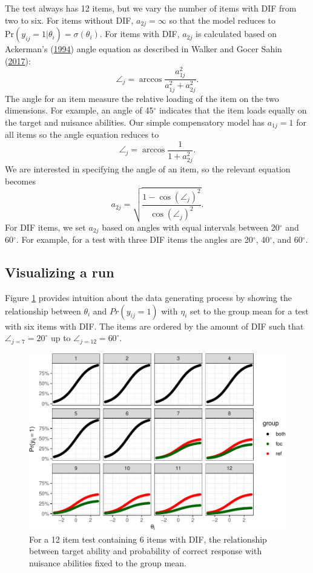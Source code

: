 \documentclass[
  11pt,
]{article}
\begin{document}
The test always has 12 items, but we vary the number of items with DIF from two to six. For items without DIF, \(a_{2j} = \infty\) so that the model reduces to \(\text{Pr}(y_{ij} = 1 | \theta_i) = \sigma(\theta_i)\). For items with DIF, \(a_{2j}\) is calculated based on Ackerman's (\protect\hyperlink{ref-ackerman1994using}{1994}) angle equation as described in Walker and Gocer Sahin (\protect\hyperlink{ref-walker2017using}{2017}):
\[
\angle_j = \arccos \dfrac{a_{1j}^2}{a_{1j}^2 + a_{2j}^2}.
\]
The angle for an item measure the relative loading of the item on the two dimensions. For example, an angle of 45\(^\circ\) indicates that the item loads equally on the target and nuisance abilities. Our simple compensatory model has \(a_{1j} = 1\) for all items so the angle equation reduces to
\[
\angle_j = \arccos \dfrac{1}{1 + a_{2j}^2}.
\]
We are interested in specifying the angle of an item, so the relevant equation becomes
\[
a_{2j} = \sqrt{\dfrac{1 - \cos(\angle_j)^2}{\cos(\angle_j)^2}}.
\]
For DIF items, we set \(a_{2j}\) based on angles with equal intervals between 20\(^\circ\) and 60\(^\circ\). For example, for a test with three DIF items the angles are 20\(^\circ\), 40\(^\circ\), and 60\(^\circ\).

\hypertarget{visualizing-a-run}{%
\subsection{Visualizing a run}\label{visualizing-a-run}}

Figure \ref{fig:difmap} provides intuition about the data generating process by showing the relationship between \(\theta_i\) and \(Pr(y_{ij} = 1)\) with \(\eta_i\) set to the group mean for a test with six items with DIF. The items are ordered by the amount of DIF such that \(\angle_{j = 7} = 20^\circ\) up to \(\angle_{j = 12} = 60^\circ\).

\begin{figure}[H]

{\centering \includegraphics[width=0.7\linewidth]{paper_files/figure-latex/difmap-1} 

}

\caption{For a 12 item test containing 6 items with DIF, the relationship between target ability and probability of correct response with nuisance abilities fixed to the group mean.}\label{fig:difmap}
\end{figure}
\end{document}
